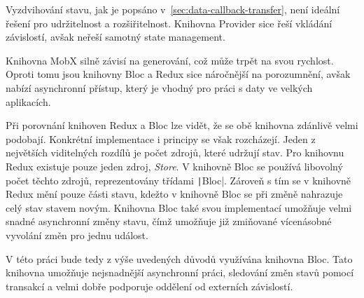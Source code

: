 Vyzdvihování stavu,
jak je popsáno v~\ref{sec:data-callback-transfer},
není ideální řešení pro udržitelnost a rozšiřitelnost.
Knihovna Provider sice řeší vkládání závislostí,
avšak neřeší samotný state management.

Knihovna MobX silně závisí na generování,
což může trpět na svou rychlost.
Oproti tomu jsou knihovny Bloc a Redux sice náročnější na porozumnění,
avšak nabízí asynchronní přístup,
který je vhodný pro práci s daty ve velkých aplikacích.

Při porovnání knihoven Redux a Bloc lze vidět,
že se obě knihovna zdánlivě velmi podobají.
Konkrétní implementace i principy se však rozcházejí.
Jeden z největších viditelných rozdílů je počet zdrojů,
které udržují stav.
Pro knihovnu Redux existuje pouze jeden zdroj, \emph{Store}.
V knihovně Bloc se používá libovolný počet těchto zdrojů,
reprezentovány třídami \texttt|Bloc|.
Zároveň s tím se v knihovně Redux mění pouze části stavu,
kdežto v knihovně Bloc se při změně nahrazuje celý stav stavem novým.
Knihovna Bloc také svou implementací umožňuje velmi snadné asynchronní změny
stavu,
čímž umožňuje již zmiňované vícenásobné vyvolání změn pro jednu událost.

V této práci bude tedy z výše uvedených důvodů využívána knihovna Bloc.
Tato knihovna umožňuje nejsnadnější asynchronní práci,
sledování změn stavů pomocí transakcí
a velmi dobře podporuje oddělení od externích závislostí.
